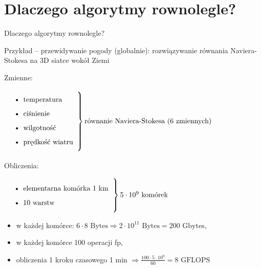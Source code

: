\section{Dlaczego algorytmy rownolegle?}

\begin{frame}{Dlaczego algorytmy rownolegle?}

\begin{exampleblock}{Przykład -- przewidywanie pogody (globalnie):}
rozwiązywanie równania Naviera-Stokesa na 3D siatce wokół Ziemi

Zmienne: 

  $\left. \parbox{10em}
{\begin{itemize}
   \item \text{temperatura}
   \item \text{ciśnienie}
   \item \text{wilgotność}
   \item \text{prędkość wiatru}
  \end{itemize}}
\right \} \text{równanie Naviera-Stokesa (6 zmiennych)}$
\end{exampleblock}

Obliczenia:

$\left. \parbox{15em}
{\begin{itemize}
   \item \text{elementarna komórka 1 km}
   \item \text{10 warstw}
  \end{itemize}}
\right \} 5\cdot10^9\text{ komórek}$

\begin{itemize}
    \item w każdej komórce:
	$6\cdot 8 \text{ Bytes} \Rightarrow 2\cdot 10^{11} \text{ Bytes} = 200 \text{ Gbytes}$,

    \item w każdej komórce 100 operacji fp,
    \item obliczenia 1 kroku czasowego 1 min $\Rightarrow \frac{100\cdot5\cdot10^9}{60} = 8 \text{ GFLOPS}$
 \end{itemize}

\end{frame}
